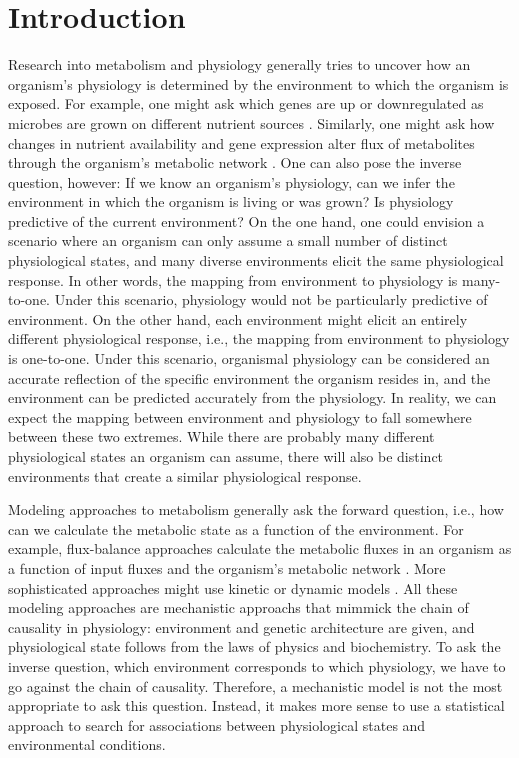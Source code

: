 \documentclass[12pt]{article}
\begin{document}
\section*{Introduction}


Research into metabolism and physiology generally tries to uncover how an organism's physiology is determined by the environment to which the organism is exposed. For example, one might ask which genes are up or downregulated as microbes are grown on different nutrient sources \cite{Taoetal1999,Huaetal2004,Wuetal2004}. Similarly, one might ask how changes in nutrient availability and gene expression alter flux of metabolites through the organism's metabolic network \cite{FischerSauer2003,Leeetal2009,Boeretal2010,HaverkornvanRijsewijketal2011}. One can also pose the inverse question, however: If we know an organism's physiology, can we infer the environment in which the organism is living or was grown? Is physiology predictive of the current environment? On the one hand, one could envision a scenario where an organism can only assume a small number of distinct physiological states, and many diverse environments elicit the same physiological response. In other words, the mapping from environment to physiology is many-to-one. Under this scenario, physiology would not be particularly predictive of environment. On the other hand, each environment might elicit an entirely different physiological response, i.e., the mapping from environment to physiology is one-to-one. Under this scenario, organismal physiology can be considered an accurate reflection of the specific environment the organism resides in, and the environment can be predicted accurately from the physiology. In reality, we can expect the mapping between environment and physiology to fall somewhere between these two extremes. While there are probably many different physiological states an organism can assume, there will also be distinct environments that create a similar physiological response.

Modeling approaches to metabolism generally ask the forward question, i.e., how can we calculate the metabolic state as a function of the environment. For example, flux-balance approaches calculate the metabolic fluxes in an organism as a function of input fluxes and the organism's metabolic network \cite{Segreetal2002,Feistetal2007,SnitkinSegre2008,Orthetal2010}. More sophisticated approaches might use kinetic or dynamic models \cite{Covertetal2008,Adadietal2012}. All these modeling approaches are mechanistic approachs that mimmick the chain of causality in physiology: environment and genetic architecture are given, and physiological state follows from the laws of physics and biochemistry. To ask the inverse question, which environment corresponds to which physiology, we have to go against the chain of causality. Therefore, a mechanistic model is not the most appropriate to ask this question. Instead, it makes more sense to use a statistical approach to search for associations between physiological states and environmental conditions.
\end{document}
